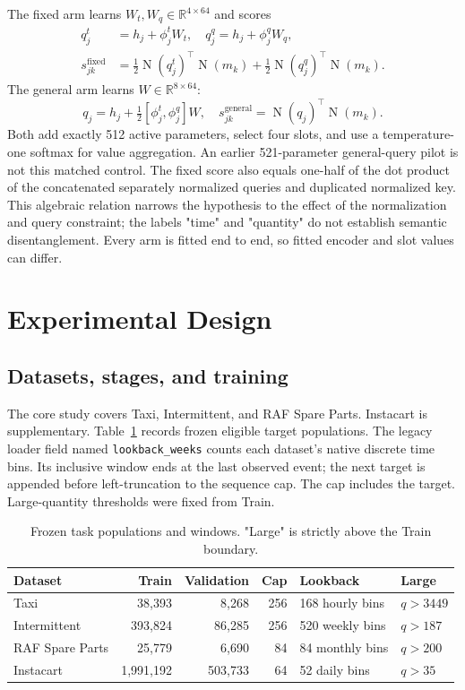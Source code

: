 \documentclass[runningheads]{llncs}
\newcommand{\Nrm}{\operatorname{N}}
\begin{document}
The fixed arm learns
$W_t,W_q\in\mathbb R^{4\times64}$ and scores
\begin{align}
 q_j^t&=h_j+\phi_j^tW_t,\quad
 q_j^q=h_j+\phi_j^qW_q,\nonumber\\
 s_{jk}^{\mathrm{fixed}}
 &=\tfrac12\Nrm(q_j^t)^\top\Nrm(m_k)
 +\tfrac12\Nrm(q_j^q)^\top\Nrm(m_k).
 \label{eq:fixed}
\end{align}
The general arm learns $W\in\mathbb R^{8\times64}$:
\begin{equation}
 q_j=h_j+\tfrac12[\phi_j^t,\phi_j^q]W,\quad
 s_{jk}^{\mathrm{general}}=
 \Nrm(q_j)^\top\Nrm(m_k).
 \label{eq:general}
\end{equation}
Both add exactly 512 active parameters, select
four slots, and use a temperature-one softmax
for value aggregation. An earlier 521-parameter
general-query pilot is not this matched control.
The fixed score also equals one-half of the dot
product of the concatenated separately normalized
queries and duplicated normalized key. This
algebraic relation narrows the hypothesis to the
effect of the normalization and query constraint;
the labels "time" and "quantity" do not establish
semantic disentanglement. Every arm is fitted end
to end, so fitted encoder and slot values can differ.

\section{Experimental Design}
\subsection{Datasets, stages, and training}
The core study covers Taxi, Intermittent, and
RAF Spare Parts. Instacart is supplementary.
Table~\ref{tab:data} records frozen eligible
target populations. The legacy loader field
named \texttt{lookback\_weeks} counts each dataset's
native discrete time bins. Its inclusive window
ends at the last observed event; the next target
is appended before left-truncation to the
sequence cap. The cap includes the target.
Large-quantity thresholds were fixed from Train.

\begin{table}[t]
\caption{Frozen task populations and windows.
"Large" is strictly above the Train boundary.}
\label{tab:data}
\centering\small
\begin{tabular}{lrrrll}
\toprule
Dataset & Train & Validation & Cap & Lookback & Large\\
\midrule
Taxi & 38,393 & 8,268 & 256 & 168 hourly bins & $q>3449$\\
Intermittent & 393,824 & 86,285 & 256 &
520 weekly bins & $q>187$\\
RAF Spare Parts & 25,779 & 6,690 & 84 &
84 monthly bins & $q>200$\\
Instacart & 1,991,192 & 503,733 & 64 &
52 daily bins & $q>35$\\
\bottomrule
\end{tabular}
\end{table}
\end{document}

